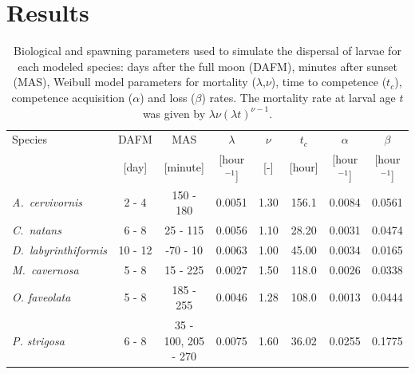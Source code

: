 \documentclass[preprint,12pt,authoryear]{elsarticle}
\begin{document}
\section*{Results}

\begin{table}
    \begin{adjustwidth}{-1in}{-1in}
    \centering
    \footnotesize
    \begin{tabular}{lccccccc}
        \hline
        Species & DAFM  & MAS      &  $\lambda$     & $\nu$ & $t_c$  & $\alpha$      & $\beta$ \\
                & [day] & [minute] &  [hour$^{-1}$] & [-]   & [hour] & [hour$^{-1}$] & [hour$^{-1}$] \\
        \hline
        \textit{A.~cervivornis} & 2 - 4 & 150 - 180 & 0.0051 & 1.30 & 156.1 & 0.0084 & 0.0561 \\
        \textit{C.~natans}      & 6 - 8 & 25 - 115  &  0.0056 & 1.10 & 28.20 & 0.0031 & 0.0474 \\
        \textit{D.~labyrinthiformis} & 10 - 12 & -70 - 10 & 0.0063 & 1.00 &  45.00 & 0.0034 & 0.0165 \\
        \textit{M.~cavernosa}   & 5 - 8 & 15 - 225 & 0.0027 & 1.50 & 118.0 & 0.0026 & 0.0338 \\
        \textit{O. faveolata}   & 5 - 8 & 185 - 255 &  0.0046 & 1.28 & 108.0 & 0.0013 & 0.0444 \\
        \textit{P. strigosa}    & 6 - 8 &  35 - 100, 205 - 270 & 0.0075 & 1.60 & 36.02 & 0.0255 & 0.1775 \\
        \hline
    \end{tabular}
    \end{adjustwidth}
    \caption{Biological and spawning parameters used to simulate the dispersal of larvae for each modeled species: days after the full moon (DAFM), minutes after sunset (MAS), Weibull model parameters for mortality ($\lambda$,$\nu$), time to competence ($t_c$), competence acquisition ($\alpha$) and loss ($\beta$) rates. The mortality rate at larval age $t$ was given by $\lambda\nu(\lambda t)^{\nu-1}$.}\label{tab:species}
\end{table}
\end{document}

